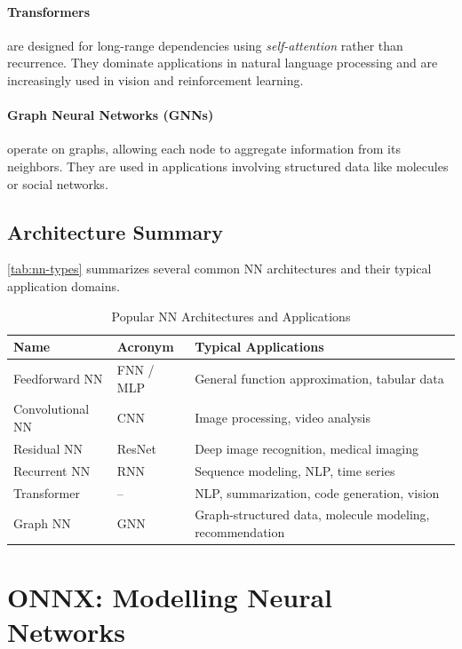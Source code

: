 \documentclass[oneside,11pt,dvipsnames]{book}
\numberwithin{equation}{section}
\theoremstyle{definition}
\theoremstyle{remark}
\begin{document}
\paragraph{Transformers} are designed for long-range dependencies using \emph{self-attention} rather than recurrence. They dominate applications in natural language processing and are increasingly used in vision and reinforcement learning.

\paragraph{Graph Neural Networks (GNNs)} operate on graphs, allowing each node to aggregate information from its neighbors. They are used in applications involving structured data like molecules or social networks.

\subsection{Architecture Summary}

\autoref{tab:nn-types} summarizes several common NN architectures and their typical application domains.

\begin{table}[ht]
\caption{Popular NN Architectures and Applications}\label{tab:nn-types}
\centering
\small
\begin{tabular}{llp{8cm}@{}}
\toprule
\textbf{Name} & \textbf{Acronym} & \textbf{Typical Applications} \\
\midrule
Feedforward NN & FNN / MLP & General function approximation, tabular data \\
Convolutional NN & CNN & Image processing, video analysis \\
Residual NN & ResNet & Deep image recognition, medical imaging \\
Recurrent NN & RNN & Sequence modeling, NLP, time series \\
Transformer & -- & NLP, summarization, code generation, vision \\
Graph NN & GNN & Graph-structured data, molecule modeling, recommendation \\
\bottomrule
\end{tabular}
\end{table}


\section{ONNX: Modelling Neural Networks}\label{sec:onnx}
\end{document}
